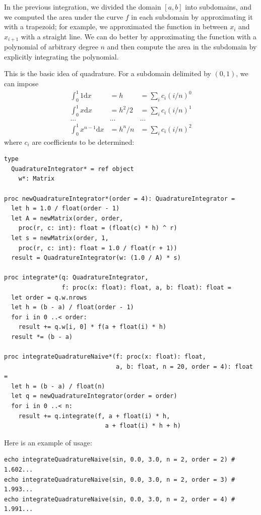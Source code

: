 \documentclass[justified, sixbynine]{tufte-book}
\def\ft{\small\tt}
\theoremstyle{plain}%
\newtheorem * {corollary}{Corollary}
\theoremstyle{definition}
\theoremstyle{remark}
\newtheorem * {remark}{Remark}
\newtheorem * {note}{Note}
\begin{document}
\begin{fullwidth}

In the previous integration, we divided the domain $[a, b]$ into subdomains, and we computed the area under the curve $f$ in each subdomain by approximating it with a trapezoid; for example, we approximated the function in between $x_i$ and $x_{i+1}$ with a straight line. We can do better by approximating the function with a polynomial of arbitrary degree $n$ and then compute the area in the subdomain by explicitly integrating the polynomial.

This is the basic idea of quadrature. For a subdomain delimited by $(0, 1)$, we can impose
\begin{eqnarray}
\int_0^1 1\textrm{d}x &= h &= \sum_i c_i (i/n)^0 \\
\int_0^1 x\textrm{d}x &= h^2/2 &= \sum_i c_i (i/n)^1 \\
... & ... & ... \\
\int_0^1 x^{n-1}\textrm{d}x &= h^n/n &= \sum_i c_i (i/n)^2
\end{eqnarray}
where $c_i$ are coefficients to be determined:


\begin{lstlisting}[caption={in file: {\ft nlib.nim}}]
type
  QuadratureIntegrator* = ref object
    w*: Matrix

proc newQuadratureIntegrator*(order = 4): QuadratureIntegrator =
  let h = 1.0 / float(order - 1)
  let A = newMatrix(order, order,
    proc(r, c: int): float = (float(c) * h) ^ r)
  let s = newMatrix(order, 1,
    proc(r, c: int): float = 1.0 / float(r + 1))
  result = QuadratureIntegrator(w: (1.0 / A) * s)

proc integrate*(q: QuadratureIntegrator,
                f: proc(x: float): float, a, b: float): float =
  let order = q.w.nrows
  let h = (b - a) / float(order - 1)
  for i in 0 ..< order:
    result += q.w[i, 0] * f(a + float(i) * h)
  result *= (b - a)

proc integrateQuadratureNaive*(f: proc(x: float): float,
                               a, b: float, n = 20, order = 4): float =
  let h = (b - a) / float(n)
  let q = newQuadratureIntegrator(order = order)
  for i in 0 ..< n:
    result += q.integrate(f, a + float(i) * h,
                            a + float(i) * h + h)
\end{lstlisting}

Here is an example of usage:

\begin{lstlisting}
echo integrateQuadratureNaive(sin, 0.0, 3.0, n = 2, order = 2) # 1.602...
echo integrateQuadratureNaive(sin, 0.0, 3.0, n = 2, order = 3) # 1.993...
echo integrateQuadratureNaive(sin, 0.0, 3.0, n = 2, order = 4) # 1.991...
\end{lstlisting}


\end{fullwidth}
\end{document}
